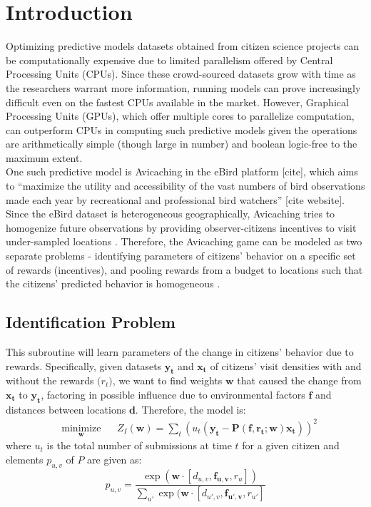 \documentclass[12pt]{article}
\newcommand{\vect}[1]{\mathbf{#1}}  %
\newcommand{\matr}[1]{\mathbf{#1}}  %
\begin{document}
    \tableofcontents
    \listoftables
    \listoffigures
    \section{Introduction} \label{sec:introduction}
    Optimizing predictive models datasets obtained from citizen science projects can be computationally expensive due to limited parallelism offered by Central Processing Units (CPUs). Since these crowd-sourced datasets grow with time as the researchers warrant more information, running models can prove increasingly difficult even on the fastest CPUs available in the market. However, Graphical Processing Units (GPUs), which offer multiple cores to parallelize computation, can outperform CPUs in computing such predictive models given the operations are arithmetically simple (though large in number) and boolean logic-free to the maximum extent.\\
    
    One such predictive model is Avicaching \cite{Xue2016Avi1} in the eBird platform [cite], which aims to ``maximize the utility and accessibility of the vast numbers of bird observations made each year by recreational and professional bird watchers'' [cite website]. Since the eBird dataset is heterogeneous geographically, Avicaching tries to homogenize future observations by providing observer-citizens incentives to visit under-sampled locations \cite{Xue2016Avi1}. Therefore, the Avicaching game can be modeled as two separate problems - identifying parameters of citizens' behavior on a specific set of rewards (incentives), and pooling rewards from a budget to locations such that the citizens' predicted behavior is homogeneous \cite{Xue2016Avi2}.
    
    \subsection{Identification Problem} \label{sec:iden_problem}
    This subroutine will learn parameters of the change in citizens' behavior due to rewards. Specifically, given datasets $\vect{y_t}$ and $\vect{x_t}$ of citizens' visit densities with and without the rewards $\vect(r_t)$, we want to find weights $\matr{w}$ that caused the change from $\vect{x_t}$ to $\vect{y_t}$, factoring in possible influence due to environmental factors $\matr{f}$ and distances between locations $\matr{d}$. Therefore, the model is:
    \begin{equation} \label{eq:iden_problem}
    \begin{aligned}
    & \underset{\matr{w}}{\text{minimize}}
    & & Z_I(\matr{w}) = \sum_{t} (u_t(\vect{y_t} - \matr{P}(\matr{f}, \vect{r_t}; \matr{w})\vect{x_t}))^{2}
    \end{aligned}
    \end{equation}
    where $u_t$ is the total number of submissions at time $t$ for a given citizen and elements $p_{u, v}$ of $P$ are given as:
    \begin{equation} \label{eq:puv_equation}
    p_{u, v} = \frac{\exp{(\matr{w} \cdot [d_{u, v}, \vect{f_{u, v}}, r_{u}])}}{\sum_{u'} \exp{(\matr{w} \cdot [d_{u', v}, \vect{f_{u', v}}, r_{u'}]}}
    \end{equation}
    
\end{document}
